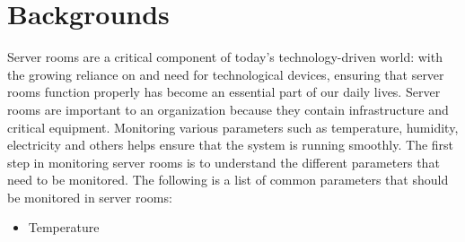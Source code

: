 
\section{Backgrounds}
Server rooms are a critical component of today's technology-driven world: with the growing reliance on and need for technological devices, ensuring that server rooms function properly has become an essential part of our daily lives. Server rooms are important to an organization because they contain infrastructure and critical equipment. Monitoring various parameters such as temperature, humidity, electricity and others helps ensure that the system is running smoothly. The first step in monitoring server rooms is to understand the different parameters that need to be monitored. The following is a list of common parameters that should be monitored in server rooms:\\
\begin{itemize}
    \item Temperature
\end{itemize}
